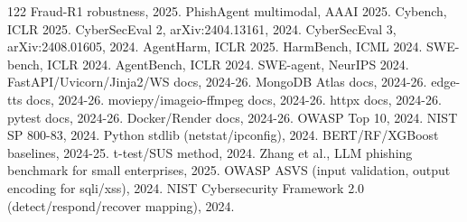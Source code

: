 \documentclass[11pt,a4paper]{article}
\begin{document}
\begin{thebibliography}{122}
 Fraud-R1 robustness, 2025.
 PhishAgent multimodal, AAAI 2025.
 Cybench, ICLR 2025.
 CyberSecEval 2, arXiv:2404.13161, 2024.
 CyberSecEval 3, arXiv:2408.01605, 2024.
 AgentHarm, ICLR 2025.
 HarmBench, ICML 2024.
 SWE-bench, ICLR 2024.
 AgentBench, ICLR 2024.
 SWE-agent, NeurIPS 2024.
 FastAPI/Uvicorn/Jinja2/WS docs, 2024-26.
 MongoDB Atlas docs, 2024-26.
 edge-tts docs, 2024-26.
 moviepy/imageio-ffmpeg docs, 2024-26.
 httpx docs, 2024-26.
 pytest docs, 2024-26.
 Docker/Render docs, 2024-26.
 OWASP Top 10, 2024.
 NIST SP 800-83, 2024.
 Python stdlib (netstat/ipconfig), 2024.
 BERT/RF/XGBoost baselines, 2024-25.
 t-test/SUS method, 2024.
 Zhang et al., LLM phishing benchmark for small enterprises, 2025.
 OWASP ASVS (input validation, output encoding for sqli/xss), 2024.
 NIST Cybersecurity Framework 2.0 (detect/respond/recover mapping), 2024.
\end{thebibliography}
\end{document}
